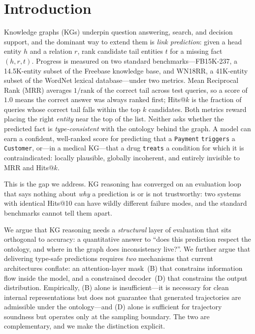\section{Introduction}
\label{sec:introduction}

Knowledge graphs (KGs) underpin question answering, search, and decision
support, and the dominant way to extend them is \emph{link prediction}:
given a head entity $h$ and a relation $r$, rank candidate tail entities
$t$ for a missing fact $(h, r, t)$. Progress is measured on two standard
benchmarks---FB15K-237, a 14.5K-entity subset of the Freebase knowledge
base, and WN18RR, a 41K-entity subset of the WordNet lexical
database---under two metrics. Mean Reciprocal Rank (MRR) averages
$1/\mathrm{rank}$ of the correct tail across test queries, so a score of
$1.0$ means the correct answer was always ranked first; Hits@$k$ is the
fraction of queries whose correct tail falls within the top $k$ candidates.
Both metrics reward placing the right \emph{entity} near the top of the
list. Neither asks whether the predicted fact is \emph{type-consistent}
with the ontology behind the graph. A model can earn a confident,
well-ranked score for predicting that a \texttt{Payment} \texttt{triggers}
a \texttt{Customer}, or---in a medical KG---that a drug \texttt{treats} a
condition for which it is contraindicated: locally plausible, globally
incoherent, and entirely invisible to MRR and Hits@$k$.

This is the gap we address. KG reasoning has converged on an evaluation
loop that says nothing about \emph{why} a prediction is or is not
trustworthy: two systems with identical Hits@10 can have wildly different
failure modes, and the standard benchmarks cannot tell them apart.

We argue that KG reasoning needs a \emph{structural} layer of evaluation
that sits orthogonal to accuracy: a quantitative answer to ``does this
prediction respect the ontology, and where in the graph does inconsistency
live?''. We further argue that delivering type-safe predictions requires
\emph{two} mechanisms that current architectures conflate: an attention-layer
mask~(B) that constrains information flow inside the model, and a
constrained decoder~(D) that constrains the output distribution. Empirically,
(B) alone is insufficient---it is necessary for clean internal
representations but does not guarantee that generated trajectories are
admissible under the ontology---and (D) alone is sufficient for trajectory
soundness but operates only at the sampling boundary. The two are
complementary, and we make the distinction explicit.

